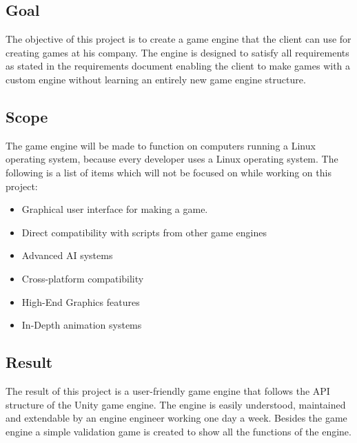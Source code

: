 \documentclass{article} %
\begin{document}
    \subsection{Goal}
    The objective of this project is to create a game engine that the client can use for creating games at his company.
    The engine is designed to satisfy all requirements as stated in the requirements document enabling the client to make games with a custom engine without learning an entirely new game engine structure.

    \subsection{Scope}
    The game engine will be made to function on computers running a Linux operating system, because every developer uses a Linux operating system.
    \newline\newline
    The following is a list of items which will not be focused on while working on this project:  
    \begin{itemize}
        \item Graphical user interface for making a game.
        \item Direct compatibility with scripts from other game engines
        \item Advanced AI systems 
        \item Cross-platform compatibility
        \item High-End Graphics features
        \item In-Depth animation systems
    \end{itemize}

    \subsection{Result}
    The result of this project is a user-friendly game engine that follows the API structure of the Unity game engine. 
    The engine is easily understood, maintained and extendable by an engine engineer working one day a week.
    \newline\newline
    Besides the game engine a simple validation game is created to show all the functions of the engine.
    \newpage
\end{document}

